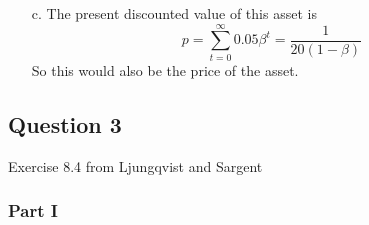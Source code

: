 \documentclass{article}
\begin{document}
\begin{itemize}
	\item[c.] The present discounted value of this asset is $$ p = \sum_{t=0}^\infty 0.05\beta^t = \frac{1}{20(1-\beta)} $$ So this would also be the price of the asset.
	
\end{itemize}



\subsection*{Question 3}
Exercise 8.4 from Ljungqvist and Sargent

\subsubsection*{Part I}
\end{document}
